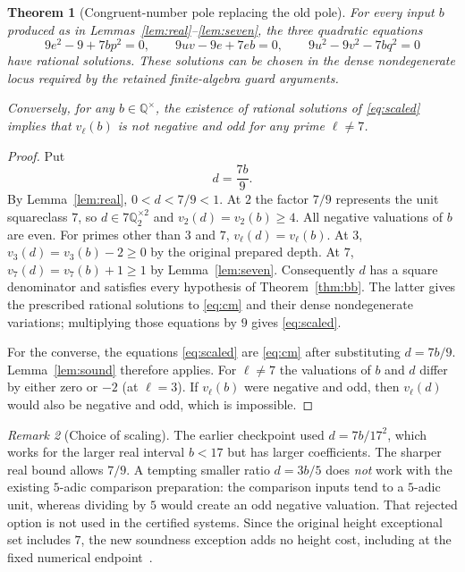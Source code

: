 \documentclass[11pt,a4paper]{article}
\newtheorem{theorem}{Theorem}[section]
\theoremstyle{remark}
\newtheorem{remark}[theorem]{Remark}
\newcommand{\Q}{\mathbb Q}
\begin{document}
\begin{theorem}[Congruent-number pole replacing the old pole]
\label{thm:pole}
For every input $b$ produced as in
Lemmas~\ref{lem:real}--\ref{lem:seven}, the three
quadratic equations
\begin{equation}\label{eq:scaled}
 9e^2-9+7bp^2=0,\qquad
 9uv-9e+7eb=0,\qquad
 9u^2-9v^2-7bq^2=0
\end{equation}
have rational solutions. These solutions can be
chosen in the dense nondegenerate locus required
by the retained finite-algebra guard arguments.

Conversely, for any $b\in\Q^\times$,
the existence of rational solutions of
\eqref{eq:scaled} implies that $v_\ell(b)$
is not negative and odd for any
prime $\ell\ne7$.
\end{theorem}
\begin{proof}
Put
\[
 d=\frac{7b}{9}.
\]
By Lemma~\ref{lem:real}, $0<d<7/9<1$.
At $2$ the factor $7/9$ represents the
unit squareclass $7$, so
$d\in7\Q_2^{\times2}$ and
$v_2(d)=v_2(b)\ge4$.
All negative valuations of $b$ are even.
For primes other than $3$ and $7$,
$v_\ell(d)=v_\ell(b)$.
At $3$,
$v_3(d)=v_3(b)-2\ge0$ by the original
prepared depth. At $7$,
$v_7(d)=v_7(b)+1\ge1$
by Lemma~\ref{lem:seven}.
Consequently $d$ has a square denominator
and satisfies every hypothesis of
Theorem~\ref{thm:bb}. The latter gives
the prescribed rational solutions to
\eqref{eq:cm} and their dense
nondegenerate variations; multiplying
those equations by $9$ gives
\eqref{eq:scaled}.

For the converse, the equations
\eqref{eq:scaled} are
\eqref{eq:cm} after substituting
$d=7b/9$. Lemma~\ref{lem:sound}
therefore applies. For $\ell\ne7$
the valuations of $b$ and $d$ differ
by either zero or $-2$ (at $\ell=3$).
If $v_\ell(b)$ were negative and odd,
then $v_\ell(d)$ would also be negative
and odd, which is impossible.
\end{proof}

\begin{remark}[Choice of scaling]
The earlier checkpoint used $d=7b/17^2$,
which works for the larger real interval
$b<17$ but has larger coefficients.
The sharper real bound allows $7/9$.
A tempting smaller ratio $d=3b/5$
does \emph{not} work with the existing
$5$-adic comparison preparation: the
comparison inputs tend to a $5$-adic unit,
whereas dividing by $5$ would create
an odd negative valuation. That rejected
option is not used in the certified
systems. Since the original height
exceptional set includes $7$, the
new soundness exception adds no height
cost, including at the fixed numerical
endpoint~\cite{V62}.
\end{remark}
\end{document}
